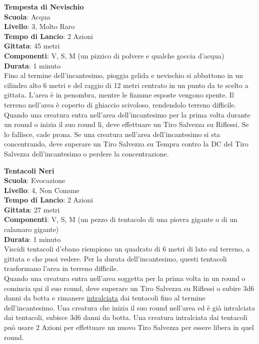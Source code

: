 \begin{multicols}{2}
\medskip\textbf{Tempesta di Nevischio}\\
\textbf{Scuola}: Acqua\\
\textbf{Livello}: 3, Molto Raro\\
\textbf{Tempo di Lancio}: 2 Azioni\\
\textbf{Gittata}: 45 metri\\
\textbf{Componenti}: V, S, M (un pizzico di polvere e qualche goccia d'acqua)\\
\textbf{Durata}: 1 minuto\\
Fino al termine dell'incantesimo, pioggia gelida e nevischio si abbattono in un cilindro alto 6 metri e del raggio di 12 metri centrato in un punto da te scelto a gittata. L'area è in penombra, mentre le fiamme esposte vengono spente. Il terreno nell'area è coperto di ghiaccio scivoloso, rendendolo terreno difficile. Quando una creatura entra nell'area dell'incantesimo per la prima volta durante un round o inizia il suo round lì, deve effettuare un Tiro Salvezza su Riflessi. Se lo fallisce, cade prona. Se una creatura nell'area dell'incantesimo si sta concentrando, deve superare un Tiro Salvezza su Tempra contro la DC del Tiro Salvezza dell'incantesimo o perdere la concentrazione.

\medskip\textbf{Tentacoli Neri}\\
\textbf{Scuola}: Evocazione\\
\textbf{Livello}: 4, Non Comune\\
\textbf{Tempo di Lancio}: 2 Azioni\\
\textbf{Gittata}: 27 metri\\
\textbf{Componenti}: V, S, M (un pezzo di tentacolo di una piovra gigante o di un calamaro gigante)\\
\textbf{Durata}: 1 minuto\\
Viscidi tentacoli d'ebano riempiono un quadrato di 6 metri di lato sul terreno, a gittata e che puoi vedere. Per la durata dell'incantesimo, questi tentacoli trasformano l'area in terreno difficile.\\
Quando una creatura entra nell'area soggetta per la prima volta in un round o comincia qui il suo round, deve superare un Tiro Salvezza su Riflessi o subire 3d6 danni da botta e rimanere \hyperlink{intralciato}{intralciata} dai tentacoli fino al termine dell'incantesimo. Una creatura che inizia il suo round nell'area ed è già intralciata dai tentacoli, subisce 3d6 danni da botta. Una creatura intralciata dai tentacoli può usare 2 Azioni per effettuare un nuovo Tiro Salvezza per essere libera in quel round.


\end{multicols}

